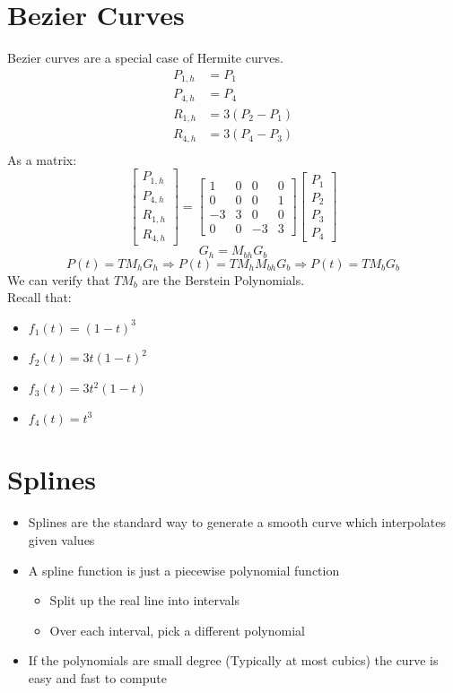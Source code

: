 \documentclass{article}
\begin{document}
\section*{Bezier Curves}
Bezier curves are a special case of Hermite curves.
\begin{align*}
    P_{1, h} &= P_1\\
    P_{4, h} &= P_4\\
    R_{1, h} &= 3(P_2 - P_1)\\
    R_{4, h} &= 3(P_4 - P_3)\\
\end{align*}
As a matrix:
\[\begin{bmatrix}P_{1, h} \\ P_{4, h} \\ R_{1, h} \\ R_{4, h}\end{bmatrix} = \begin{bmatrix} 1 & 0 & 0 & 0 \\ 0 & 0 & 0 & 1 \\ -3 & 3 & 0 & 0 \\ 0 & 0 & -3 & 3 \end{bmatrix}\begin{bmatrix}P_1 \\ P_2 \\ P_3 \\ P_4 \end{bmatrix}\]
\[G_h = M_{bh}G_b\]
\[P(t) = TM_h G_h \Rightarrow P(t) = TM_h M_{bh} G_b \Rightarrow P(t) = TM_b G_b\]
We can verify that $TM_b$ are the Berstein Polynomials.\\
Recall that:
\begin{itemize}
    \item $f_1(t) = (1 - t)^3$
    \item $f_2(t) = 3t(1-t)^2$
    \item $f_3(t) = 3t^2(1-t)$
    \item $f_4(t) = t^3$
\end{itemize}
\section*{Splines}
\begin{itemize}
    \item Splines are the standard way to generate a smooth curve which interpolates given values
    \item A spline function is just a piecewise polynomial function
    \begin{itemize}
        \item Split up the real line into intervals
        \item Over each interval, pick a different polynomial
    \end{itemize}
    \item If the polynomials are small degree (Typically at most cubics) the curve is easy and fast to compute
\end{itemize}
\end{document}
